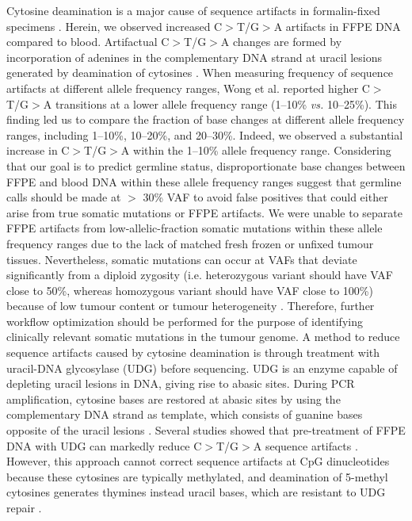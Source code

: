 Cytosine deamination is a major cause of sequence artifacts in formalin-fixed specimens \cite{Wong2014, Do2012, Oh2015, Spencer2013, Do2013, Kim2017, Chen2014}. Herein, we observed increased C$>$T/G$>$A artifacts in FFPE DNA compared to blood. Artifactual C$>$T/G$>$A changes are formed by incorporation of adenines in the complementary DNA strand at uracil lesions generated by deamination of cytosines \cite{Do2015a}. When measuring frequency of sequence artifacts at different allele frequency ranges, Wong et al. \cite{Wong2014} reported higher C$>$T/G$>$A transitions at a lower allele frequency range (1--10\% \textit{vs.} 10--25\%). This finding led us to compare the fraction of base changes at different allele frequency ranges, including 1--10\%, 10--20\%, and 20--30\%. Indeed, we observed a substantial increase in C$>$T/G$>$A within the 1--10\% allele frequency range. Considering that our goal is to predict germline status, disproportionate base changes between FFPE and blood DNA within these allele frequency ranges suggest that germline calls should be made at $>$ 30\% VAF to avoid false positives that could either arise from true somatic mutations or FFPE artifacts. We were unable to separate FFPE artifacts from low-allelic-fraction somatic mutations within these allele frequency ranges due to the lack of matched fresh frozen or unfixed tumour tissues. Nevertheless, somatic mutations can occur at VAFs that deviate significantly from a diploid zygosity (i.e. heterozygous variant should have VAF close to 50\%, whereas homozygous variant should have VAF close to 100\%) because of low tumour content or tumour heterogeneity \cite{Kim2017a, Xu2017, Carrot-Zhang2016, Tian2015, Cai2016}. Therefore, further workflow optimization should be performed for the purpose of identifying clinically relevant somatic mutations in the tumour genome. A method to reduce sequence artifacts caused by cytosine deamination is through treatment with uracil-DNA glycosylase (UDG) before sequencing. UDG is an enzyme capable of depleting uracil lesions in DNA, giving rise to abasic sites. During PCR amplification, cytosine bases are restored at abasic sites by using the complementary DNA strand as template, which consists of guanine bases opposite of the uracil lesions \cite{Do2015a}. Several studies showed that pre-treatment of FFPE DNA with UDG can markedly reduce C$>$T/G$>$A sequence artifacts \cite{Do2013, Kim2017, Do2012}. However, this approach cannot correct sequence artifacts at CpG dinucleotides because these cytosines are typically methylated, and deamination of 5-methyl cytosines generates thymines instead uracil bases, which are resistant to UDG repair \cite{Do2013}.


